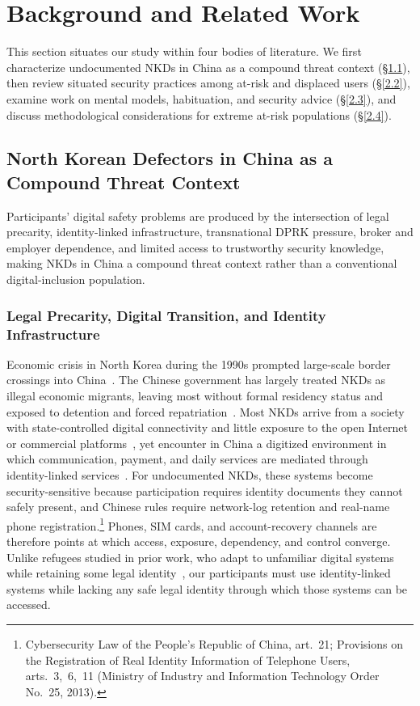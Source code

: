 \documentclass[conference,compsoc]{IEEEtran}
\begin{document}
\section{Background and Related Work}

This section situates our study within four bodies of literature. We first characterize undocumented NKDs in China as a compound threat context (\S\ref{2.1}), then review situated security practices among at-risk and displaced users (\S\ref{2.2}), examine work on mental models, habituation, and security advice (\S\ref{2.3}), and discuss methodological considerations for extreme at-risk populations (\S\ref{2.4}).

\subsection{North Korean Defectors in China as a Compound Threat Context}
\label{2.1}

Participants' digital safety problems are produced by the intersection of legal precarity, identity-linked infrastructure, transnational DPRK pressure, broker and employer dependence, and limited access to trustworthy security knowledge, making NKDs in China a compound threat context rather than a conventional digital-inclusion population.

\subsubsection{Legal Precarity, Digital Transition, and Identity Infrastructure}

Economic crisis in North Korea during the 1990s prompted large-scale border crossings into China~\cite{gunduz2017effect,lankov2004north,chang2008migration}. The Chinese government has largely treated NKDs as illegal economic migrants, leaving most without formal residency status and exposed to detention and forced repatriation~\cite{beck2007perilous,cho2013systemizing}. Most NKDs arrive from a society with state-controlled digital connectivity and little exposure to the open Internet or commercial platforms~\cite{warf2015hermit}, yet encounter in China a digitized environment in which communication, payment, and daily services are mediated through identity-linked services~\cite{castells2009mobile,kim2018china}. For undocumented NKDs, these systems become security-sensitive because participation requires identity documents they cannot safely present, and Chinese rules require network-log retention and real-name phone registration.\footnote{Cybersecurity Law of the People's Republic of China, art.~21; Provisions on the Registration of Real Identity Information of Telephone Users, arts.~3,~6,~11 (Ministry of Industry and Information Technology Order No.~25, 2013).} Phones, SIM cards, and account-recovery channels are therefore points at which access, exposure, dependency, and control converge. Unlike refugees studied in prior work, who adapt to unfamiliar digital systems while retaining some legal identity~\cite{simko2018computer,tran2024security,arunasalam2024understanding}, our participants must use identity-linked systems while lacking any safe legal identity through which those systems can be accessed.
\end{document}

